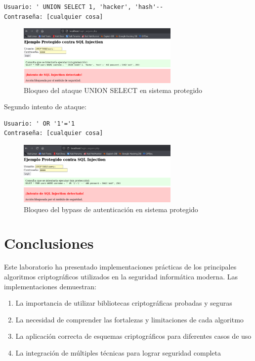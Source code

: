 \documentclass[12pt,a4paper]{article}
\begin{document}
\begin{lstlisting}[caption=Intento de ataque UNION SELECT en sistema protegido]
Usuario: ' UNION SELECT 1, 'hacker', 'hash'-- 
Contraseña: [cualquier cosa]
\end{lstlisting}

\begin{figure}[H]
    \centering
    \includegraphics[width=0.7\textwidth]{./assets/img12.png}
    \caption{Bloqueo del ataque UNION SELECT en sistema protegido}
    \label{fig:proteccion-union}
\end{figure}

Segundo intento de ataque:

\begin{lstlisting}[caption=Intento de bypass en sistema protegido]
Usuario: ' OR '1'='1
Contraseña: [cualquier cosa]
\end{lstlisting}

\begin{figure}[H]
    \centering
    \includegraphics[width=0.7\textwidth]{./assets/img13.png}
    \caption{Bloqueo del bypass de autenticación en sistema protegido}
    \label{fig:proteccion-bypass}
\end{figure}


\section{Conclusiones}

Este laboratorio ha presentado implementaciones prácticas de los principales
algoritmos criptográficos utilizados en la seguridad informática moderna. Las
implementaciones demuestran:

\begin{enumerate}
    \item La importancia de utilizar bibliotecas criptográficas probadas y seguras
    \item La necesidad de comprender las fortalezas y limitaciones de cada algoritmo
    \item La aplicación correcta de esquemas criptográficos para diferentes casos de uso
    \item La integración de múltiples técnicas para lograr seguridad completa
\end{enumerate}
\end{document}
